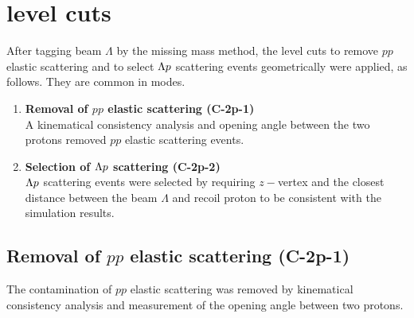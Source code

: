 \clearpage
\section{ level cuts}
\label{sec-Lp_common}

After tagging beam $\Lambda$ by the missing mass method, the  level cuts to remove $pp$ elastic scattering and to select $\Lambda p$ scattering events geometrically were applied, as follows. They are common in  modes.
\begin{enumerate}
  \item {\bf Removal of $pp$ elastic scattering ({\bf C-2p-1}) } \\
  A kinematical consistency analysis and opening angle between the two protons removed $pp$ elastic scattering events. 
  \item {\bf Selection of $\Lambda p$ scattering ({\bf C-2p-2}) } \\
  $\Lambda p$ scattering events were selected by requiring $z-$vertex and the closest distance between the beam $\Lambda$ and recoil proton to be consistent with the simulation results.
\end{enumerate}



\subsection{Removal of $pp$ elastic scattering ({\bf C-2p-1})}
\label{sec-ppRemoval}

The contamination of $pp$ elastic scattering was removed by kinematical consistency analysis and measurement of the opening angle between two protons.

